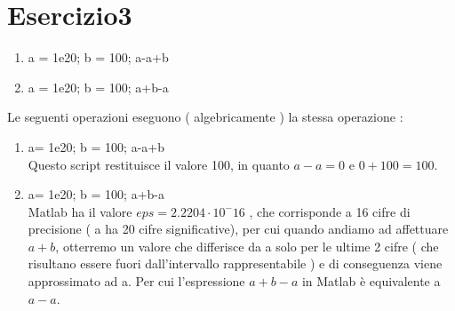 \section{Esercizio3}
\begin{enumerate}
\item a = 1e20; b = 100; a-a+b
\item a = 1e20; b = 100; a+b-a
\end{enumerate}
Le seguenti operazioni eseguono ( algebricamente ) la stessa operazione : 
\begin{enumerate}
\item a= 1e20; b = 100; a-a+b \\
Questo script restituisce il valore 100, in quanto $a-a = 0$ e $0+100 = 100$.
\item a= 1e20; b = 100; a+b-a\\
Matlab ha il valore $ eps = 2.2204\cdot10^-16$ , che corrisponde a 16 cifre di precisione ( a ha 20 cifre significative), per cui quando andiamo ad affettuare $a+b$, otterremo un valore  che differisce da a solo per le ultime 2 cifre ( che risultano essere fuori dall'intervallo rappresentabile ) e di conseguenza viene approssimato ad a. Per cui l'espressione $a+b-a$ in Matlab è equivalente a $a-a$.
\end{enumerate}